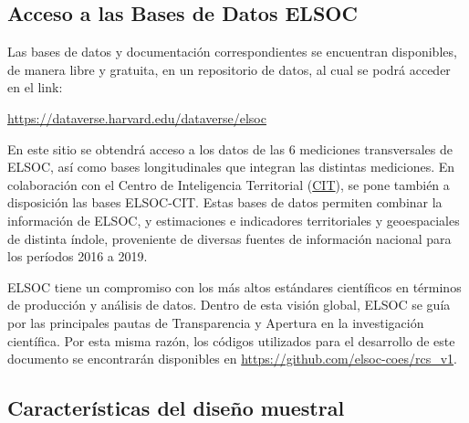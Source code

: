 \documentclass[
  12pt,
]{book}
\begin{document}
\hypertarget{acceso-a-las-bases-de-datos-elsoc}{%
\subsection*{Acceso a las Bases de Datos ELSOC}\label{acceso-a-las-bases-de-datos-elsoc}}

Las bases de datos y documentación correspondientes se encuentran disponibles, de manera libre y gratuita, en un repositorio de datos, al cual se podrá acceder en el link:

\url{https://dataverse.harvard.edu/dataverse/elsoc}

En este sitio se obtendrá acceso a los datos de las 6 mediciones transversales de ELSOC, así como bases longitudinales que integran las distintas mediciones. En colaboración con el Centro de Inteligencia Territorial (\href{https://cit.uai.cl/}{CIT}), se pone también a disposición las bases ELSOC-CIT. Estas bases de datos permiten combinar la información de ELSOC, y estimaciones e indicadores territoriales y geoespaciales de distinta índole, proveniente de diversas fuentes de información nacional para los períodos 2016 a 2019.

ELSOC tiene un compromiso con los más altos estándares científicos en términos de producción y análisis de datos. Dentro de esta visión global, ELSOC se guía por las principales pautas de Transparencia y Apertura en la investigación científica. Por esta misma razón, los códigos utilizados para el desarrollo de este documento se encontrarán disponibles en \url{https://github.com/elsoc-coes/rcs_v1}.

\hypertarget{caracteruxedsticas-del-diseuxf1o-muestral}{%
\subsection*{Características del diseño muestral}\label{caracteruxedsticas-del-diseuxf1o-muestral}}
\end{document}
